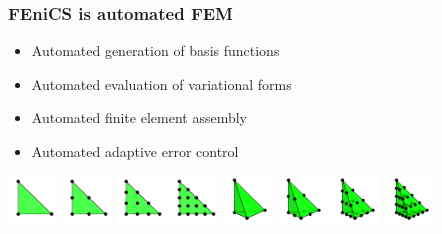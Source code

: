 \begin{frame}
  \frametitle{FEniCS is automated FEM}

  \begin{itemize}
  \item
    Automated generation of basis functions
  \item
    Automated evaluation of variational forms
  \item
    Automated finite element assembly
  \item
    Automated adaptive error control
  \end{itemize}

\includegraphics[width=1.3cm]{png/CG1_2d.png}
\includegraphics[width=1.3cm]{png/CG2_2d.png}
\includegraphics[width=1.3cm]{png/CG3_2d.png}
\includegraphics[width=1.3cm]{png/CG4_2d.png}
\includegraphics[width=1.3cm]{png/CG1_3d.png}
\includegraphics[width=1.3cm]{png/CG2_3d.png}
\includegraphics[width=1.3cm]{png/CG3_3d.png}
\includegraphics[width=1.3cm]{png/CG4_3d.png} \\

\end{frame}
